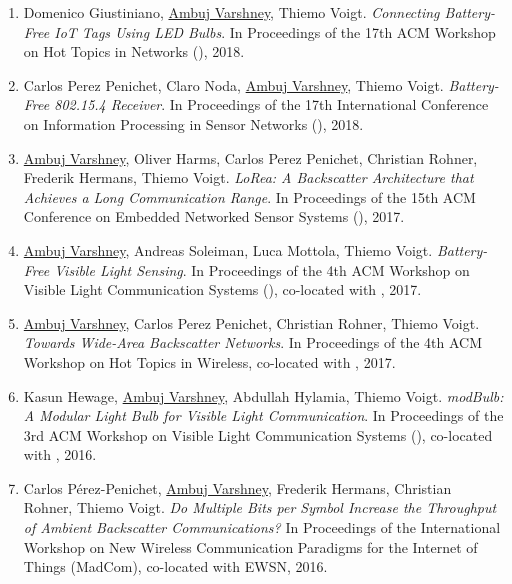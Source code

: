 \begin{enumerate}

\item Domenico Giustiniano, \underline{Ambuj Varshney}, Thiemo Voigt. 
\emph{Connecting Battery-Free IoT Tags Using LED Bulbs}. 
In Proceedings of the 17th ACM Workshop on Hot Topics in Networks (), 2018.


\item Carlos Perez Penichet, Claro Noda, \underline{Ambuj Varshney}, Thiemo Voigt. 
\emph{Battery-Free 802.15.4 Receiver}. 
In Proceedings of the 17th International Conference on Information Processing in Sensor Networks (), 2018.


\item \underline{Ambuj Varshney}, Oliver Harms\pg, Carlos Perez Penichet, Christian Rohner, Frederik Hermans, Thiemo Voigt.
\emph{LoRea: A Backscatter Architecture that Achieves a Long Communication Range}.
In Proceedings of the 15th ACM Conference on Embedded Networked Sensor Systems (), 2017.

\item \underline{Ambuj Varshney}, Andreas Soleiman\pg, Luca Mottola, Thiemo Voigt.
\emph{Battery-Free Visible Light Sensing}.
In Proceedings of the 4th ACM Workshop on Visible Light Communication Systems (), co-located with , 2017.

\item \underline{Ambuj Varshney}, Carlos Perez Penichet, Christian Rohner, Thiemo Voigt. 
\emph{Towards Wide-Area Backscatter Networks}. 
In Proceedings of the 4th ACM Workshop on Hot Topics in Wireless, co-located with , 2017.


\item Kasun Hewage, \underline{Ambuj Varshney}, Abdullah Hylamia\ug, Thiemo Voigt.
\emph{modBulb: A Modular Light Bulb for Visible Light Communication}.
In Proceedings of the 3rd ACM Workshop on Visible Light Communication Systems (), co-located with , 2016.

\item Carlos Pérez-Penichet, \underline{Ambuj Varshney}, Frederik Hermans, Christian Rohner, Thiemo Voigt. 
\emph{Do Multiple Bits per Symbol Increase the Throughput of Ambient Backscatter Communications?} 
In Proceedings of the International Workshop on New Wireless Communication Paradigms for the Internet of Things (MadCom), co-located with EWSN, 2016.


\end{enumerate}
